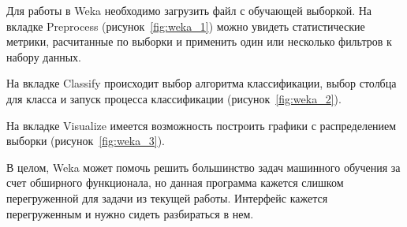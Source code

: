 Для работы в Weka необходимо загрузить файл с обучающей выборкой. На вкладке Preprocess (рисунок~\ref{fig:weka_1}) можно увидеть статистические метрики, расчитанные по выборки и применить один или несколько фильтров к набору данных.



На вкладке Classify происходит выбор алгоритма классификации, выбор столбца для класса и запуск процесса классификации (рисунок~\ref{fig:weka_2}).




На вкладке Visualize имеется возможность построить графики с распределением выборки (рисунок~\ref{fig:weka_3}).




В целом, Weka может помочь решить большинство задач машинного обучения за счет обширного функционала, но данная программа кажется слишком перегруженной для задачи из текущей работы. Интерфейс кажется перегруженным и нужно сидеть разбираться в нем.
